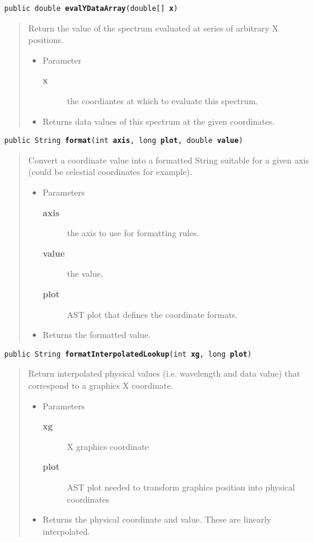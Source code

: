 \documentclass[twoside,11pt,nolof]{starlink}
\providecommand{\method}[1]{\texttt{#1}}
\newenvironment{desc}{\begin{quote}}{\end{quote}}
\begin{document}
\method{public double \textbf{evalYDataArray}(\texttt{double[]} \textbf{x})\label{l37}\label{l38}}
\begin{desc}Return the value of the spectrum evaluated at series of
 arbitrary X positions.
\begin{itemize}
\item{Parameter
  \begin{description}
   \item[\textbf{x}]{the coordiantes at which to evaluate this spectrum.}
  \end{description}}
\end{itemize}
\begin{itemize}
\item{Returns data values of this spectrum at the given coordinates. }
\end{itemize}
\end{desc}

\method{public String \textbf{format}(\texttt{int} \textbf{axis}, \texttt{long} \textbf{plot}, \texttt{double} \textbf{value})\label{l39}\label{l40}}
\begin{desc}Convert a coordinate value into a formatted String suitable for
 a given axis (could be celestial coordinates for example).
\begin{itemize}
\item{Parameters
  \begin{description}
   \item[\textbf{axis}]{the axis to use for formatting rules.}
   \item[\textbf{value}]{the value.}
   \item[\textbf{plot}]{AST plot that defines the coordinate formats.}
  \end{description}}
\end{itemize}
\begin{itemize}
\item{Returns the formatted value. }
\end{itemize}
\end{desc}

\method{public String \textbf{formatInterpolatedLookup}(\texttt{int} \textbf{xg}, \texttt{long} \textbf{plot})\label{l41}\label{l42}}
\begin{desc}Return interpolated physical values (i.e. wavelength and data
 value) that correspond to a graphics X coordinate.
\begin{itemize}
\item{Parameters
  \begin{description}
   \item[\textbf{xg}]{X graphics coordinate}
   \item[\textbf{plot}]{AST plot needed to transform graphics position
            into physical coordinates}
  \end{description}}
\end{itemize}
\begin{itemize}
\item{Returns the physical coordinate and value. These are
 linearly interpolated. }
\end{itemize}
\end{desc}
\end{document}
